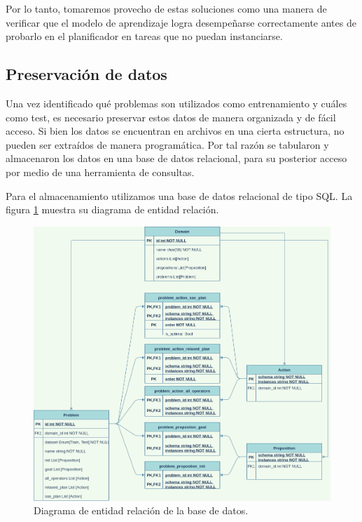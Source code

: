 Por lo tanto, tomaremos provecho de estas soluciones como una manera de
verificar que el modelo de aprendizaje logra desempeñarse correctamente antes de
probarlo en el planificador en tareas que no puedan instanciarse.

\subsection{Preservación de datos}

Una vez identificado qué problemas son utilizados como entrenamiento y cuáles como
test, es necesario preservar estos datos de manera organizada y de fácil acceso.
Si bien los datos se encuentran en archivos en una cierta estructura, no pueden
ser extraídos de manera programática. Por tal razón se tabularon y almacenaron
los datos en una base de datos relacional, para su posterior acceso por medio de
una herramienta de consultas.

Para el almacenamiento utilizamos una base de datos relacional de tipo SQL. La
figura \ref{fig:ERD} muestra su diagrama de entidad relación.

\begin{figure}[t!]
    \centering
    \includegraphics[width=\linewidth]{figures/ERD.png}
    \caption{Diagrama de entidad relación de la base de datos.}
    \label{fig:ERD}
\end{figure}

